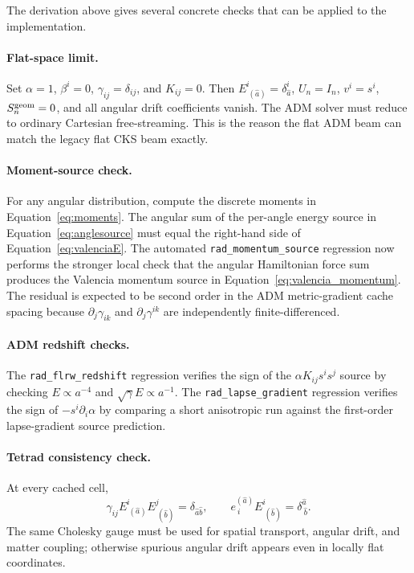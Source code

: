\documentclass[11pt]{article}
\newcommand{\code}[1]{\texttt{#1}}
\begin{document}
The derivation above gives several concrete checks that can be applied to the
implementation.

\paragraph{Flat-space limit.}
Set \(\alpha=1\), \(\beta^i=0\), \(\gamma_{ij}=\delta_{ij}\), and
\(K_{ij}=0\).  Then \(E^i_{\ (\hat a)}=\delta^i_{\hat a}\),
\(U_n=I_n\), \(v^i=s^i\), \(S_n^{\rm geom}=0\), and all angular drift
coefficients vanish.  The ADM solver must reduce to ordinary Cartesian
free-streaming.  This is the reason the flat ADM beam can match the legacy
flat CKS beam exactly.

\paragraph{Moment-source check.}
For any angular distribution, compute the discrete moments in
Equation~\eqref{eq:moments}.  The angular sum of the per-angle energy source
in Equation~\eqref{eq:anglesource} must equal the right-hand side of
Equation~\eqref{eq:valenciaE}.  The automated
\code{rad\_momentum\_source} regression now performs the stronger local check
that the angular Hamiltonian force sum produces the Valencia momentum source
in Equation~\eqref{eq:valencia_momentum}.  The residual is expected to be
second order in the ADM metric-gradient cache spacing because
\(\partial_j\gamma_{ik}\) and \(\partial_j\gamma^{ik}\) are independently
finite-differenced.

\paragraph{ADM redshift checks.}
The \code{rad\_flrw\_redshift} regression verifies the sign of the
\(\alpha K_{ij}s^is^j\) source by checking \(E\propto a^{-4}\) and
\(\sqrt{\gamma}E\propto a^{-1}\).  The \code{rad\_lapse\_gradient}
regression verifies the sign of \(-s^i\partial_i\alpha\) by comparing a short
anisotropic run against the first-order lapse-gradient source prediction.

\paragraph{Tetrad consistency check.}
At every cached cell,
\begin{equation}
  \gamma_{ij}E^i_{\ (\hat a)}E^j_{\ (\hat b)}
  =\delta_{\hat a\hat b},\qquad
  e^{(\hat a)}_{\ i}E^i_{\ (\hat b)}
  =\delta^{\hat a}_{\ \hat b}.
\end{equation}
The same Cholesky gauge must be used for spatial transport, angular drift, and
matter coupling; otherwise spurious angular drift appears even in locally flat
coordinates.
\end{document}
